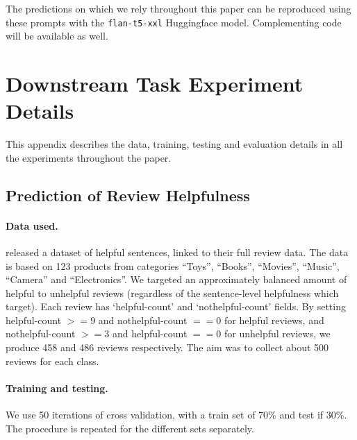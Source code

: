 The \taxtype{} predictions on which we rely throughout this paper can be reproduced using these prompts with the \texttt{flan-t5-xxl} Huggingface model. Complementing code will be available as well.


\section{Downstream Task Experiment Details}
\label{sec_appendix_experiments}

This appendix describes the data, training, testing and evaluation details in all the experiments throughout the paper.


\subsection{Prediction of Review Helpfulness}
\label{sec_appendix_experiments_review_helpfulness}



\paragraph{Data used.}
\citet{gamzu2021helpfulsentences} released a dataset of helpful sentences, linked to their full review data. The data is based on 123 products from categories ``Toys'', ``Books'', ``Movies'', ``Music'', ``Camera'' and ``Electronics''. We targeted an approximately balanced amount of helpful to unhelpful reviews (regardless of the sentence-level helpfulness which \citeauthor{gamzu2021helpfulsentences} target). Each review has `helpful-count' and `nothelpful-count' fields. By setting helpful-count $>= 9$ and nothelpful-count $== 0$ for helpful reviews, and nothelpful-count $>= 3$ and helpful-count $== 0$ for unhelpful reviews, we produce 458 and 486 reviews respectively. The aim was to collect about 500 reviews for each class.

\paragraph{Training and testing.}
We use 50 iterations of cross validation, with a train set of 70\% and test if 30\%. The procedure is repeated for the different \taxtype{} sets separately.

